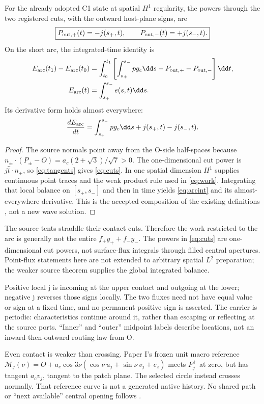 \begin{proposition}\label{prop:crossing}
For the already adopted C1 state at spatial $H^1$ regularity, the powers through the two registered cuts, with the outward host-plane signs, are
\begin{equation}\label{eq:cuts}
 \boxed{P_{\rm out,+}(t)=-j(s_+,t),\qquad P_{\rm out,-}(t)=+j(s_-,t).}
\end{equation}
On the short arc, the integrated-time identity is
\begin{align}
 E_{\rm arc}(t_1)-E_{\rm arc}(t_0)
  &=\int_{t_0}^{t_1}\left[\int_{s_+}^{s_-}pg_c\dd s
            -P_{\rm out,+}-P_{\rm out,-}\right]\dd t,\label{eq:arcint}\\
 E_{\rm arc}(t)&=\int_{s_+}^{s_-}e(s,t)\dd s.\notag
\end{align}
Its derivative form holds almost everywhere:
\begin{equation}\label{eq:arc}
 \frac{dE_{\rm arc}}{dt}=\int_{s_+}^{s_-}pg_c\dd s+j(s_+,t)-j(s_-,t).
\end{equation}
\end{proposition}
\begin{proof}
The source normals point away from the O-side half-spaces because
$n_\pm\cdot(P_\pm-O)=a_c(2+\sqrt3)/\sqrt7>0$.
The one-dimensional cut power is $j\hat t\cdot n_\pm$, so \eqref{eq:tangents} gives \eqref{eq:cuts}. In one spatial dimension $H^1$ supplies continuous point traces and the weak product rule used in \eqref{eq:work}. Integrating that local balance on $[s_+,s_-]$ and then in time yields \eqref{eq:arcint} and its almost-everywhere derivative. This is the accepted composition of the existing definitions \cite[Section B.4]{assessment}, not a new wave solution.
\end{proof}

The source tents straddle their contact cuts. Therefore the work restricted to the arc is generally not the entire $f_+y_++f_-y_-$. The powers in \eqref{eq:cuts} are one-dimensional cut powers, not surface-flux integrals through filled central apertures. Point-flux statements here are not extended to arbitrary spatial $L^2$ preparation; the weaker source theorem supplies the global integrated balance.

Positive local j is incoming at the upper contact and outgoing at the lower; negative j reverses those signs locally. The two fluxes need not have equal value or sign at a fixed time, and no permanent positive sign is asserted. The carrier is periodic: characteristics continue around it, rather than escaping or reflecting at the source ports. ``Inner'' and ``outer'' midpoint labels describe locations, not an inward-then-outward routing law from O.

Even contact is weaker than crossing. Paper I's frozen unit macro reference
$\mathcal M_j(\nu)=O+a_c\cos3\nu(\cos\nu\,u_j+\sin\nu\,v_j+e_z)$ meets $P_j^+$ at zero, but has tangent $a_cv_j$, tangent to the patch plane. The selected circle instead crosses normally. That reference curve is not a generated native history. No shared path or ``next available'' central opening follows \cite[shared-point distinction]{pairedI}.
